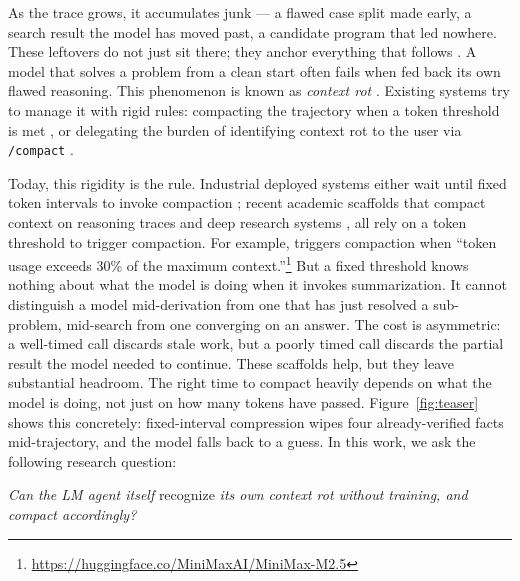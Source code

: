 \documentclass{article}
\begin{document}
As the trace grows, it accumulates junk --- a flawed case split made early, a search result the model has moved past, a candidate program that led nowhere. These leftovers do not just sit there; they anchor everything that follows \citep{laban2026llms}. A model that solves a problem from a clean start often fails when fed back its own flawed reasoning. This phenomenon is known as \emph{context rot} \citep{hong2025context, cheng2026contextualdrag}. Existing systems try to manage it with rigid rules: compacting the trajectory when a token threshold is met \citep{research2026composer2technicalreport}, or delegating the burden of identifying context rot to the user via \texttt{/compact} \citep{anthropic2025claudecode}.

  Today, this rigidity is the rule. Industrial deployed systems either wait until
  fixed token intervals to invoke compaction \citep{research2026composer2technicalreport}; recent academic scaffolds that compact context on reasoning traces \citep{wu2026reasoningcachecontinualimprovement, yan2026inftythink} and deep research systems \citep{chen2026iterresearch}, all rely on a token threshold to trigger compaction. For example, \citet{liu2025webexplorer} triggers compaction when ``token usage exceeds 30\% of the maximum context.''\footnote{\url{https://huggingface.co/MiniMaxAI/MiniMax-M2.5}}  
  But a fixed threshold knows nothing about what the model is doing when it invokes summarization. It cannot distinguish a model mid-derivation from one that has just resolved a sub-problem, mid-search from one converging on an answer. The cost is asymmetric: a well-timed call discards stale work, but a poorly timed call discards the partial result the model needed to continue. These scaffolds help, but they leave substantial headroom. The right time to compact heavily depends on what the model is doing, not just on how many tokens have passed.  Figure~\ref{fig:teaser} shows this concretely: fixed-interval
compression wipes four already-verified facts mid-trajectory, and the
model falls back to a guess. In this work, we ask the following research question:
  
\begin{tcolorbox}[enhanced,
  colback=gray!8, colframe=gray!90,
  boxrule=0.4pt, arc=3pt,
  left=2pt, right=2pt, top=4pt, bottom=4pt,
  drop fuzzy shadow=black!20, width=0.98\linewidth, center]
  \begin{center}
    \textit{Can the LM agent itself }recognize\textit{ its own context rot without training, and compact accordingly?}
  \end{center}
\end{tcolorbox}
\end{document}
